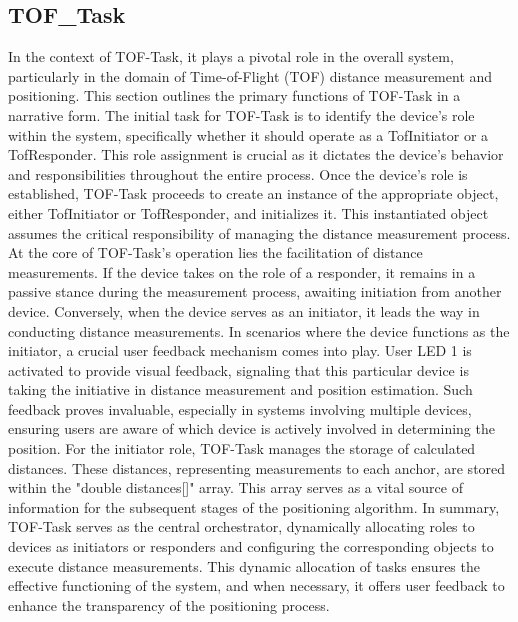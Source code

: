 \subsection{TOF\_Task}
\label{chap:tof_task}

In the context of TOF-Task, it plays a pivotal role in the overall system, particularly in the domain of Time-of-Flight (TOF) distance measurement and positioning. This section outlines the primary functions of TOF-Task in a narrative form.
\vspace{4pt}
\newline
The initial task for TOF-Task is to identify the device's role within the system, specifically whether it should operate as a TofInitiator or a TofResponder. This role assignment is crucial as it dictates the device's behavior and responsibilities throughout the entire process.
\vspace{4pt}
\newline
Once the device's role is established, TOF-Task proceeds to create an instance of the appropriate object, either TofInitiator or TofResponder, and initializes it. This instantiated object assumes the critical responsibility of managing the distance measurement process.
\vspace{4pt}
\newline
At the core of TOF-Task's operation lies the facilitation of distance measurements. If the device takes on the role of a responder, it remains in a passive stance during the measurement process, awaiting initiation from another device. Conversely, when the device serves as an initiator, it leads the way in conducting distance measurements.
\vspace{4pt}
\newline
In scenarios where the device functions as the initiator, a crucial user feedback mechanism comes into play. User LED 1 is activated to provide visual feedback, signaling that this particular device is taking the initiative in distance measurement and position estimation. Such feedback proves invaluable, especially in systems involving multiple devices, ensuring users are aware of which device is actively involved in determining the position.
\vspace{4pt}
\newline
For the initiator role, TOF-Task manages the storage of calculated distances. These distances, representing measurements to each anchor, are stored within the "double distances[]" array. This array serves as a vital source of information for the subsequent stages of the positioning algorithm.
\vspace{4pt}
\newline
In summary, TOF-Task serves as the central orchestrator, dynamically allocating roles to devices as initiators or responders and configuring the corresponding objects to execute distance measurements. This dynamic allocation of tasks ensures the effective functioning of the system, and when necessary, it offers user feedback to enhance the transparency of the positioning process.

